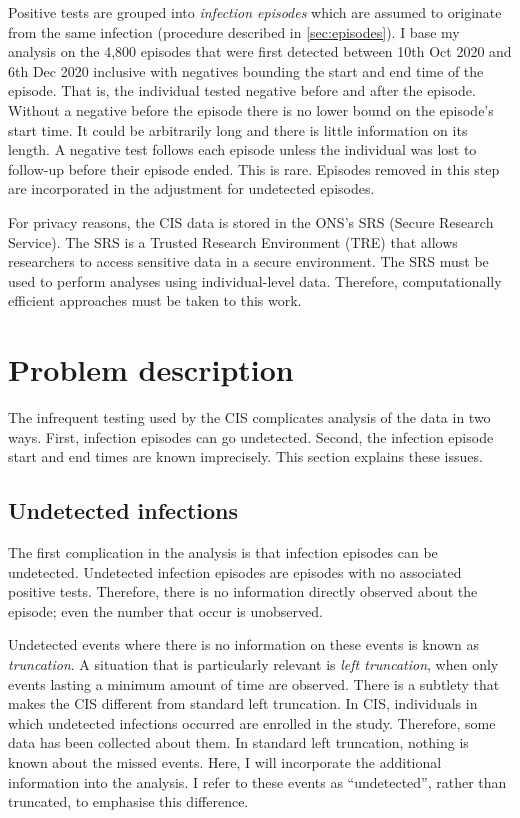 \documentclass[12pt, letterpaper]{article} %
\begin{document}
Positive tests are grouped into \emph{infection episodes} which are assumed to originate from the same infection (procedure described in \cref{sec:episodes}).
I base my analysis on the 4,800 episodes that were first detected between 10th Oct 2020 and 6th Dec 2020 inclusive with negatives bounding the start and end time of the episode.
That is, the individual tested negative before and after the episode.
Without a negative before the episode there is no lower bound on the episode's start time.
It could be arbitrarily long and there is little information on its length.
A negative test follows each episode unless the individual was lost to follow-up before their episode ended.
This is rare.
Episodes removed in this step are incorporated in the adjustment for undetected episodes.

For privacy reasons, the CIS data is stored in the ONS's SRS (Secure Research Service).
The SRS is a Trusted Research Environment (TRE) that allows researchers to access sensitive data in a secure environment.
The SRS must be used to perform analyses using individual-level data.
Therefore, computationally efficient approaches must be taken to this work.

\section{Problem description}

The infrequent testing used by the CIS complicates analysis of the data in two ways.
First, infection episodes can go undetected.
Second, the infection episode start and end times are known imprecisely.
This section explains these issues.

\subsection{Undetected infections}

The first complication in the analysis is that infection episodes can be undetected.
Undetected infection episodes are episodes with no associated positive tests.
Therefore, there is no information directly observed about the episode; even the number that occur is unobserved.

Undetected events where there is no information on these events is known as \emph{truncation}.
A situation that is particularly relevant is \emph{left truncation}, when only events lasting a minimum amount of time are observed.
There is a subtlety that makes the CIS different from standard left truncation.
In CIS, individuals in which undetected infections occurred are enrolled in the study.
Therefore, some data has been collected about them.
In standard left truncation, nothing is known about the missed events.
Here, I will incorporate the additional information into the analysis.
I refer to these events as ``undetected'', rather than truncated, to emphasise this difference.
\end{document}
